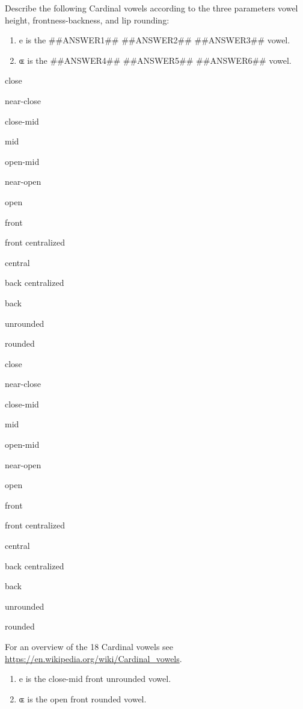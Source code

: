 
\begin{question}
Describe the following Cardinal vowels according to the three parameters
vowel height, frontness-backness, and lip rounding:

\begin{enumerate}
  \item e is the ##ANSWER1## ##ANSWER2## ##ANSWER3## vowel.
  \item ɶ is the ##ANSWER4## ##ANSWER5## ##ANSWER6## vowel.
\end{enumerate}

\begin{answerlist}
  \item close
  \item near-close
  \item close-mid
  \item mid
  \item open-mid
  \item near-open
  \item open
  \item front
  \item front centralized
  \item central
  \item back centralized
  \item back
  \item unrounded
  \item rounded
  \item close
  \item near-close
  \item close-mid
  \item mid
  \item open-mid
  \item near-open
  \item open
  \item front
  \item front centralized
  \item central
  \item back centralized
  \item back
  \item unrounded
  \item rounded
\end{answerlist}\end{question}

\begin{solution}
For an overview of the 18 Cardinal vowels see \url{https://en.wikipedia.org/wiki/Cardinal_vowels}.

\begin{enumerate}
  \item e is the close-mid front unrounded vowel.
  \item ɶ is the open front rounded vowel.
\end{enumerate}
\end{solution}


